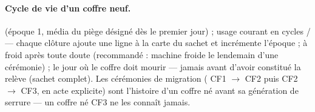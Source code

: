 \paragraph{Cycle de vie d'un coffre neuf.}  (époque 1, média du piège
désigné dès le premier jour) ; usage courant en cycles  /
 — chaque clôture ajoute une ligne à la carte du sachet et incrémente
l'époque ;  à froid après toute doute (recommandé : machine froide le
lendemain d'une cérémonie) ;  le jour où le coffre doit mourir — jamais
avant d'avoir constitué la relève (sachet complet). Les cérémonies de migration
( CF1 $\to$ CF2 puis CF2 $\to$ CF3,  en acte explicite)
sont l'histoire d'un coffre né avant sa génération de serrure — un coffre né CF3 ne les
connaît jamais.
